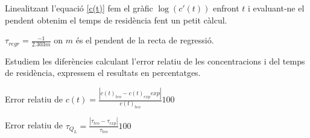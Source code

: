 \documentclass[10pt, twoside]{article}
\begin{document}
Linealitzant l'equació \eqref{c(t)} fem el gràfic $\log(c'(t))$ enfront $t$ i evaluant-ne el pendent obtenim el temps de residència fent un petit càlcul.

$\tau_{regr} = \frac{-1}{2.303m}$ on $m$ és el pendent de la recta de regressió.

Estudiem les diferències calculant l'error relatiu de les concentracions i del temps de residència, expressem el resultats en percentatges.

Error  relatiu  de  $c(t) = \frac{|c(t)_{teo} - c(t)_{exp} exp|}{c(t)_{teo}} 100$

Error relatiu de $\tau_{Q_L} = \frac{|\tau_{teo} - \tau_{exp}|}{\tau_{teo}} 100$
\end{document}

